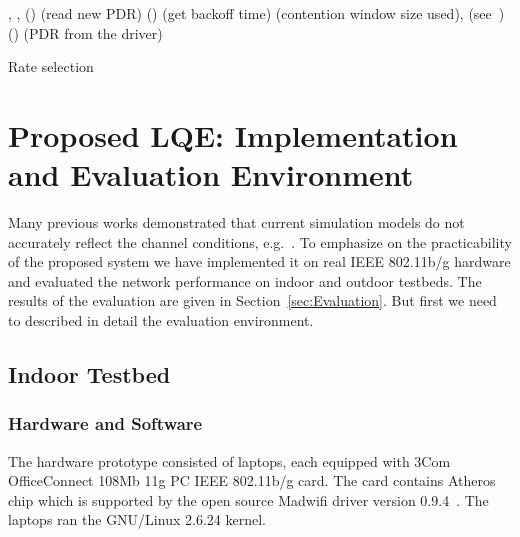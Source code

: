 \documentclass[11pt,draftclsnofoot,journal,onecolumn]{IEEEtran}
\begin{document}
\begin{algorithm}
,
,
\;
\Procedure \GetPdr() (read new PDR)\;
\KwIn{, ;}
\KwOut{;}
\Procedure \GetBot() (get backoff time)\;
\KwIn{;}
\KwOut{;}
 (contention window size used),
\;
\For{}{
\;
}
 (see~\cite[Eq. 17]{Draves_MobiCom_2004})\;
\Procedure \ReadPdr() (PDR from the driver)\;
\KwOut{;}
\For{}{
\;
\;
\;
}
\caption{Rate selection}
\label{alg:1}
\end{algorithm}

\section{Proposed LQE: Implementation and Evaluation Environment}
\label{sec:Implementation}

Many previous works demonstrated that current simulation models do not accurately reflect the channel conditions, e.g.~\cite{Newport_Simulation_2007,Lei_ieeewc_2009}. To emphasize on the practicability of the proposed system we have implemented it on real IEEE 802.11b/g hardware and evaluated the network performance on indoor and outdoor testbeds. The results of the evaluation are given in Section~\ref{sec:Evaluation}. But first we need to described in detail the evaluation environment.

\subsection{Indoor Testbed}
\label{sec:indoor_testbed}

\subsubsection{Hardware and Software}
\label{sec:hardware}

The hardware prototype consisted of laptops, each equipped with 3Com OfficeConnect 108Mb 11g PC IEEE 802.11b/g card. The card contains Atheros chip which is supported by the open source Madwifi driver version 0.9.4~\cite{MadWifi}. The laptops ran the GNU/Linux 2.6.24 kernel.
\end{document}

